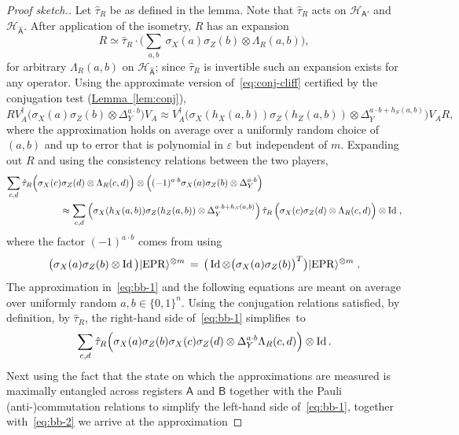 \documentclass[11pt]{article}
\numberwithin{equation}{section}
\theoremstyle{definition}
\theoremstyle{plain}
\newcommand{\expref}[2]{\hyperref[#2]{#1~\ref{#2}}}
\newcommand{\ket}[1]{|#1\rangle}
\newcommand{\Id}{\ensuremath{\mathop{\rm Id}\nolimits}}
\newcommand{\reg}[1]{{\textsf{#1}}}
\newcommand{\mH}{\mathcal{H}}
\newcommand{\eps}{\varepsilon}
\newcommand{\EPR}{{\rm EPR}}
\newcommand{\phase}{\Lambda}
\begin{document}
\begin{proof}[Proof sketch.]
Let $\hat{\tau}_R$ be as defined in the lemma. Note that $\hat{\tau}_R$ acts on $\mH_{\reg{A}'}$ and $\mH_{\hat{\reg{A}}}$. After application of the isometry, $R$ has an expansion
\begin{equation}\label{eq:r-1}
R \simeq \hat{\tau}_R \cdot \Big(\sum_{a,b} \,\sigma_X(a)\sigma_Z(b) \otimes \phase_R(a,b)\Big),
\end{equation}
 for arbitrary $\phase_R(a,b)$ on $\mH_{\hat{\reg{A}}}$; since $\hat{\tau}_R $ is invertible such an expansion exists for any operator. 
Using the approximate version of~\eqref{eq:conj-cliff} certified by the conjugation test (\expref{Lemma}{lem:conj}), 
$$ R V_A^\dagger \big(\sigma_X(a)\sigma_Z(b)\otimes \Delta_Y^{a\cdot b}\big) V_A \approx V_A^\dagger \big(\sigma_X(h_X(a,b))\sigma_Z(h_Z(a,b)) \otimes \Delta_Y^{a\cdot b + h_S(a,b)}\big)V_A R,$$
where the approximation holds on average over a uniformly random choice of $(a,b)$ and up to error that is polynomial in $\eps$ but independent of $m$. 
Expanding out $R$ and using the consistency relations between the two players, 
\begin{align}
\sum_{c,d} \hat{\tau}_R \Big(\sigma_X(c)\sigma_Z(d) &\otimes \phase_R(c,d)\Big) \otimes \Big((-1)^{a\cdot b}\sigma_X(a)\sigma_Z(b)\otimes \Delta_Y^{a\cdot b}\Big)\notag\\
& \!\!\!\!\!\!\!\!\!\!\!\!\!\!\!\!\approx \sum_{c,d} \Big(\sigma_X(h_X(a,b))\sigma_Z(h_Z(a,b)) \otimes \Delta_Y^{a\cdot b + h_S(a,b)}\Big) \,\hat{\tau}_R \, \Big(\sigma_X(c)\sigma_Z(d) \otimes \phase_R(c,d)\Big) \otimes \Id\;,\label{eq:bb-1}
\end{align}
where the factor $(-1)^{a\cdot b}$ comes from using 
$$\big(\sigma_X(a)\sigma_Z(b)\otimes \Id\big) \ket{\EPR}^{\otimes m} \,=\, \big(\Id \otimes \big(\sigma_X(a)\sigma_Z(b)\big)^T \big)\ket{\EPR}^{\otimes m}\;.$$
The approximation in~\eqref{eq:bb-1} and the following equations are meant on average over uniformly random $a,b\in\{0,1\}^n$.
Using the conjugation relations satisfied, by definition, by $\hat{\tau}_R$,  the right-hand side of~\eqref{eq:bb-1} simplifies~to 
\begin{equation}\label{eq:bb-2}
\sum_{c,d} \hat{\tau}_R \Big(\sigma_X(a)\sigma_Z(b) \sigma_X(c)\sigma_Z(d) \otimes \Delta_Y^{a\cdot b }\phase_R(c,d)\Big)  \otimes \Id.
\end{equation}
Next using the fact that the state on which the approximations are measured is maximally entangled across registers $\reg{A}$ and $\reg{B}$ together with the Pauli (anti-)commutation relations to simplify the left-hand side of~\eqref{eq:bb-1}, together with~\eqref{eq:bb-2} we arrive at the approximation

\end{proof}
\end{document}
